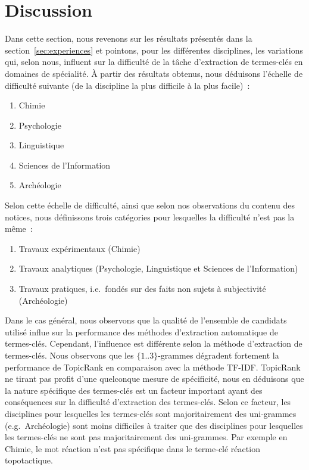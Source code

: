 \section{Discussion}
\label{sec:discussion}
  Dans cette section, nous revenons sur les résultats présentés dans la
  section~\ref{sec:experiences} et pointons, pour les différentes disciplines,
  les variations qui, selon nous, influent sur la difficulté de la tâche
  d'extraction de termes-clés en domaines de spécialité. À partir des résultats
  obtenus, nous déduisons l'échelle de difficulté suivante (de la discipline la
  plus difficile à la plus facile)~:
  \begin{enumerate}
    \item{Chimie}
    \item{Psychologie}
    \item{Linguistique}
    \item{Sciences de l'Information}
    \item{Archéologie}
  \end{enumerate}
  Selon cette échelle de difficulté, ainsi que selon nos observations du contenu
  des notices, nous définissons trois catégories pour lesquelles la difficulté
  n'est pas la même~:
  \begin{enumerate}
    \item{Travaux expérimentaux (Chimie)}
    \item{Travaux analytiques (Psychologie, Linguistique et Sciences de
          l'Information)}
    \item{Travaux pratiques, i.e.~fondés sur des faits non sujets à subjectivité
          (Archéologie)}
  \end{enumerate}

  Dans le cas général, nous observons que la qualité de l'ensemble de candidats
  utilisé influe sur la performance des méthodes d'extraction automatique de
  termes-clés. Cependant, l'influence est différente selon la méthode
  d'extraction de termes-clés. Nous observons que les $\{1..3\}$-grammes
  dégradent fortement la performance de TopicRank en comparaison avec la méthode
  TF-IDF. TopicRank ne tirant pas profit d'une quelconque mesure de spécificité,
  nous en déduisons que la nature spécifique des termes-clés est un facteur
  important ayant des conséquences sur la difficulté d'extraction des
  termes-clés. Selon ce facteur, les disciplines pour lesquelles les termes-clés
  sont majoritairement des uni-grammes (e.g.~Archéologie) sont moins difficiles
  à traiter que des disciplines pour lesquelles les termes-clés ne sont pas
  majoritairement des uni-grammes. Par exemple en Chimie, le mot
  \og{}réaction\fg{} n'est pas spécifique dans le terme-clé \og{}réaction
  topotactique\fg{}.

